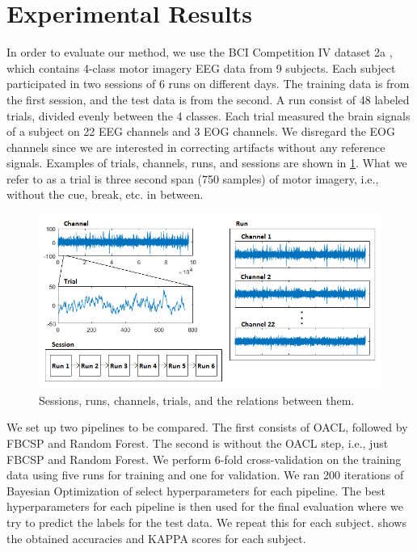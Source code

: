\section{Experimental Results}

In order to evaluate our method, we use the BCI Competition IV dataset 2a \citep{brunner2008bci}, which contains 4-class motor imagery EEG data from 9 subjects. Each subject participated in two sessions of 6 runs on different days. The training data is from the first session, and the test data is from the second. A run consist of 48 labeled trials, divided evenly between the 4 classes. Each trial measured the brain signals of a subject on 22 EEG channels and 3 EOG channels. We disregard the EOG channels since we are interested in correcting artifacts without any reference signals. Examples of trials, channels, runs, and sessions are shown in \cref{fig:dataset}. What we refer to as a trial is three second span (750 samples) of motor imagery, i.e., without the cue, break, etc. in between.

\begin{figure}
	\centering
	\begin{adjustbox}{width=\textwidth}
		\includegraphics{figures/bciiv2a.png}
	\end{adjustbox}
	\caption{Sessions, runs, channels, trials, and the relations between them.}
	\label{fig:dataset}
\end{figure}

We set up two pipelines to be compared. The first consists of OACL, followed by FBCSP and Random Forest. The second is without the OACL step, i.e., just FBCSP and Random Forest. We perform 6-fold cross-validation on the training data using five runs for training and one for validation. We ran 200 iterations of Bayesian Optimization of select hyperparameters for each pipeline. The best hyperparameters for each pipeline is then used for the final evaluation where we try to predict the labels for the test data. We repeat this for each subject.  shows the obtained accuracies and KAPPA scores for each subject.

